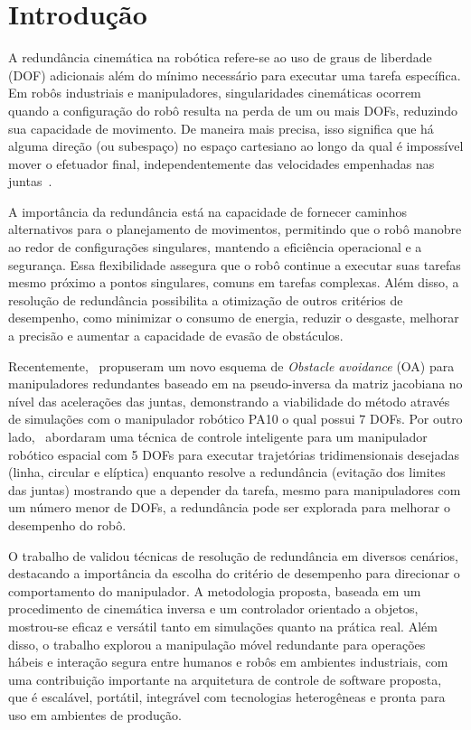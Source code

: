 \chapter{Introdução}\label{cap:introduction}

A redundância cinemática na robótica refere-se ao uso de graus de liberdade (DOF) adicionais além do mínimo necessário para executar uma
tarefa específica. Em robôs industriais e manipuladores, singularidades cinemáticas ocorrem quando a configuração do robô resulta na perda
de um ou mais DOFs, reduzindo sua capacidade de movimento. De maneira mais precisa, isso significa que há alguma direção (ou subespaço) 
no espaço cartesiano ao longo da qual é impossível mover o efetuador final, independentemente das velocidades empenhadas nas 
juntas~\cite{craig2004}. 

A importância da redundância está na capacidade de fornecer caminhos alternativos para o planejamento de movimentos,
permitindo que o robô manobre ao redor de configurações singulares, mantendo a eficiência operacional e a segurança. Essa flexibilidade 
assegura que o robô continue a executar suas tarefas mesmo próximo a pontos singulares, comuns em tarefas complexas. Além disso, a resolução
de redundância possibilita a otimização de outros critérios de desempenho, como minimizar o consumo de energia, reduzir o desgaste, melhorar 
a precisão e aumentar a capacidade de evasão de obstáculos.

Recentemente,~\cite{li2023pseudo} propuseram um novo esquema de \emph{Obstacle avoidance} (OA) para manipuladores redundantes 
baseado em na pseudo-inversa da matriz jacobiana no nível das acelerações das juntas, demonstrando a viabilidade do método através de simulações 
com o manipulador robótico PA10 o qual possui \(7\) DOFs. Por outro lado,~\cite{kuri2023som}
abordaram uma técnica de controle inteligente para um manipulador robótico espacial com 5 DOFs para executar
trajetórias tridimensionais desejadas (linha, circular e elíptica) enquanto resolve a redundância 
(evitação dos limites das juntas) mostrando que a depender da tarefa, mesmo para manipuladores com um número menor de DOFs, 
a redundância pode ser explorada para melhorar o desempenho do robô.

O trabalho de \cite{ancona2017} validou técnicas de resolução de redundância em diversos cenários, destacando a importância da escolha do critério de desempenho
para direcionar o comportamento do manipulador. A metodologia proposta, baseada em um procedimento de cinemática inversa e um controlador orientado a objetos,
mostrou-se eficaz e versátil tanto em simulações quanto na prática real. Além disso, o trabalho explorou a manipulação móvel redundante para operações hábeis 
e interação segura entre humanos e robôs em ambientes industriais, com uma contribuição importante na arquitetura de controle de software proposta, que é escalável,
portátil, integrável com tecnologias heterogêneas e pronta para uso em ambientes de produção.

